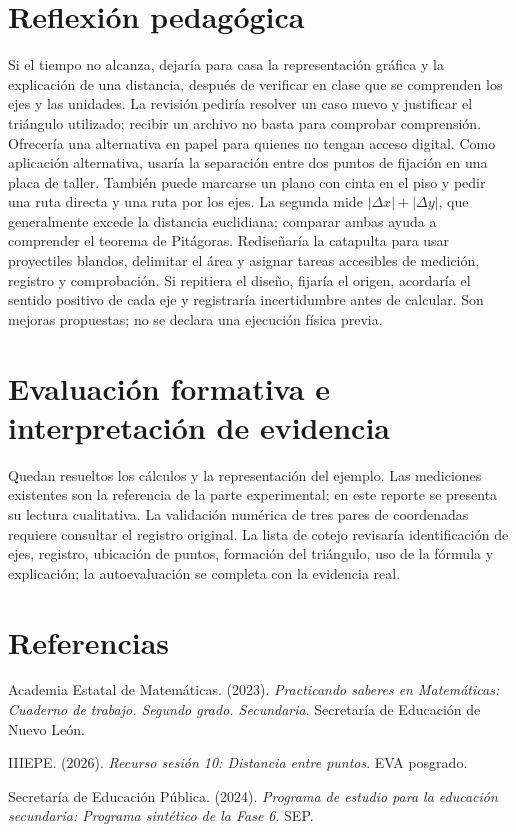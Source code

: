 \documentclass[spanish,letterpaper,oneside]{article}
\begin{document}
\section{Reflexión pedagógica}
Si el tiempo no alcanza, dejaría para casa la representación gráfica y la explicación de una distancia, después de verificar en clase que se comprenden los ejes y las unidades. La revisión pediría resolver un caso nuevo y justificar el triángulo utilizado; recibir un archivo no basta para comprobar comprensión. Ofrecería una alternativa en papel para quienes no tengan acceso digital.
Como aplicación alternativa, usaría la separación entre dos puntos de fijación en una placa de taller. También puede marcarse un plano con cinta en el piso y pedir una ruta directa y una ruta por los ejes. La segunda mide $|\Delta x|+|\Delta y|$, que generalmente excede la distancia euclidiana; comparar ambas ayuda a comprender el teorema de Pitágoras.
Rediseñaría la catapulta para usar proyectiles blandos, delimitar el área y asignar tareas accesibles de medición, registro y comprobación. Si repitiera el diseño, fijaría el origen, acordaría el sentido positivo de cada eje y registraría incertidumbre antes de calcular. Son mejoras propuestas; no se declara una ejecución física previa.
\section{Evaluación formativa e interpretación de evidencia}
Quedan resueltos los cálculos y la representación del ejemplo. Las mediciones existentes son la referencia de la parte experimental; en este reporte se presenta su lectura cualitativa. La validación numérica de tres pares de coordenadas requiere consultar el registro original. La lista de cotejo revisaría identificación de ejes, registro, ubicación de puntos, formación del triángulo, uso de la fórmula y explicación; la autoevaluación se completa con la evidencia real.

\section*{Referencias}
{\setlength{\parskip}{6pt}
\par\hangindent=1.27cm  Academia Estatal de Matemáticas. (2023). \textit{Practicando saberes en Matemáticas: Cuaderno de trabajo. Segundo grado. Secundaria}. Secretaría de Educación de Nuevo León.
\par\hangindent=1.27cm  IIIEPE. (2026). \textit{Recurso sesión 10: Distancia entre puntos}. EVA posgrado.
\par\hangindent=1.27cm  Secretaría de Educación Pública. (2024). \textit{Programa de estudio para la educación secundaria: Programa sintético de la Fase 6}. SEP.
}
\end{document}
